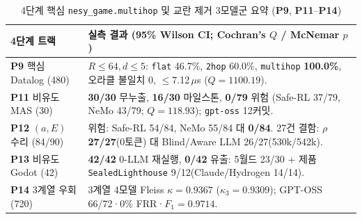\begin{table}[!tbp]
\caption{4단계 핵심 \texttt{nesy\_game.multihop} 및 교란 제거 3모델군 요약 (\textbf{P9}, \textbf{P11}--\textbf{P14})}
\label{tab:phase4-compact}
\centering
\scriptsize
\setlength{\tabcolsep}{3pt}
\begin{tabularx}{\columnwidth}{@{}>{\raggedright\arraybackslash}p{}>{\raggedright\arraybackslash}X@{}}
\toprule
\textbf{4단계 트랙} & \textbf{실측 결과 (95\% Wilson CI; Cochran's $Q$ / McNemar $p$)} \\
\midrule
\textbf{P9} 핵심 Datalog (480) & $R{\le}64, d{\le}5$: \texttt{flat} 46.7\%, \texttt{2hop} 60.0\%, \texttt{multihop} \textbf{100.0\%}, 오라클 불일치 0, $\le$7.12\,$\mu$s ($Q{=}1100.19$). \\
\textbf{P11} 비유도 MAS (30) & \textbf{30/30} 무누출, \textbf{16/30} 마일스톤, \textbf{0/79} 위험 (Safe-RL 37/79, NeMo 43/79; $Q{=}118.93$); \texttt{gpt-oss} 12커밋. \\
\textbf{P12} $(a,E)$ 수리 (84/90) & 위험: Safe-RL 54/84, NeMo 55/84 대 \system{} \textbf{0/84}. 27건 결함: $\rho$ \textbf{27/27}(0토큰) 대 Blind/Aware LLM 26/27(530k/542k). \\
\textbf{P13} 비유도 Godot (42) & \textbf{42/42} 0-LLM 재실행, \textbf{0/42} 유출: 5월드 23/30 + 제품 \texttt{SealedLighthouse} 9/12(Claude/Hydrogen 14/14). \\
\textbf{P14} 3계열 우회 (720) & 3계열 4모델 Fleiss $\kappa{=}\mathbf{0.9367}$ ($\kappa_3{=}\mathbf{0.9309}$); GPT-OSS 66/72·0\% FRR·$F_1{=}0.9714$. \\
\bottomrule
\end{tabularx}
\end{table}